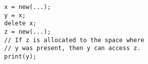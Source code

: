         \begin{verbatim}
        x = new(...);
        y = x;
        delete x;
        z = new(...);
        // If z is allocated to the space where
        // y was present, then y can access z.
        print(y);
        \end{verbatim}
